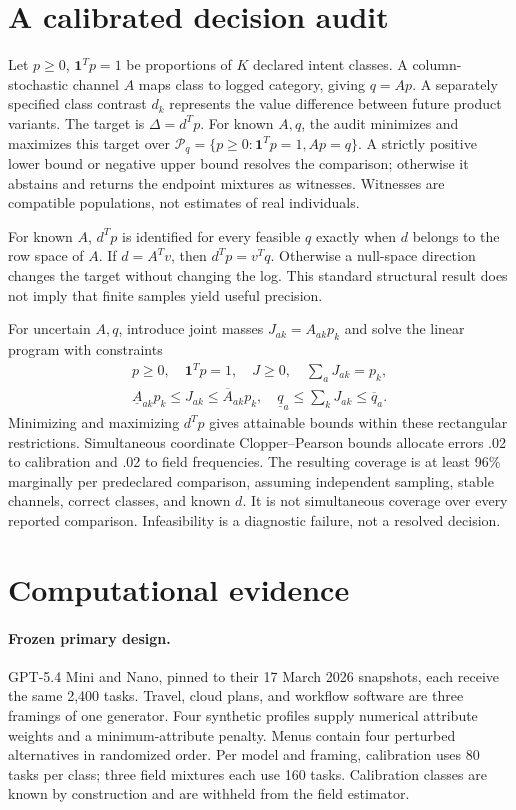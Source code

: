 \documentclass[runningheads]{llncs}
\begin{document}
\section{A calibrated decision audit}
Let $p\geq0$, $\mathbf1^Tp=1$ be proportions of $K$ declared intent classes. A column-stochastic channel $A$ maps class to logged category, giving $q=Ap$. A separately specified class contrast $d_k$ represents the value difference between future product variants. The target is $\Delta=d^Tp$. For known $A,q$, the audit minimizes and maximizes this target over $\mathcal P_q=\{p\geq0:\mathbf1^Tp=1,Ap=q\}$. A strictly positive lower bound or negative upper bound resolves the comparison; otherwise it abstains and returns the endpoint mixtures as witnesses. Witnesses are compatible populations, not estimates of real individuals.

For known $A$, $d^Tp$ is identified for every feasible $q$ exactly when $d$ belongs to the row space of $A$. If $d=A^Tv$, then $d^Tp=v^Tq$. Otherwise a null-space direction changes the target without changing the log. This standard structural result does not imply that finite samples yield useful precision.

For uncertain $A,q$, introduce joint masses $J_{ak}=A_{ak}p_k$ and solve the linear program with constraints
\begin{equation}
\begin{split}
p\geq0,\quad \mathbf1^Tp=1,\quad J\geq0,\quad \sum_aJ_{ak}=p_k,\\
\underline A_{ak}p_k\leq J_{ak}\leq\overline A_{ak}p_k,\quad
\underline q_a\leq\sum_kJ_{ak}\leq\overline q_a.
\end{split}
\end{equation}
Minimizing and maximizing $d^Tp$ gives attainable bounds within these rectangular restrictions. Simultaneous coordinate Clopper--Pearson bounds allocate errors .02 to calibration and .02 to field frequencies. The resulting coverage is at least 96\% marginally per predeclared comparison, assuming independent sampling, stable channels, correct classes, and known $d$. It is not simultaneous coverage over every reported comparison. Infeasibility is a diagnostic failure, not a resolved decision.

\section{Computational evidence}
\paragraph{Frozen primary design.}
GPT-5.4 Mini and Nano, pinned to their 17 March 2026 snapshots, each receive the same 2,400 tasks. Travel, cloud plans, and workflow software are three framings of one generator. Four synthetic profiles supply numerical attribute weights and a minimum-attribute penalty. Menus contain four perturbed alternatives in randomized order. Per model and framing, calibration uses 80 tasks per class; three field mixtures each use 160 tasks. Calibration classes are known by construction and are withheld from the field estimator.
\end{document}
